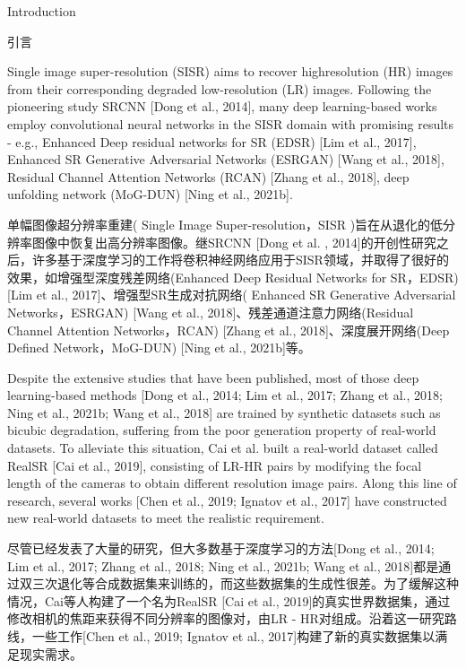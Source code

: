 Introduction

引言

Single image super-resolution (SISR) aims to recover highresolution (HR) images from their corresponding degraded low-resolution (LR) images. Following the pioneering study SRCNN [Dong et al., 2014], many deep learning-based works employ convolutional neural networks in the SISR domain with promising results - e.g., Enhanced Deep residual networks for SR (EDSR) [Lim et al., 2017], Enhanced SR Generative Adversarial Networks (ESRGAN) [Wang et al., 2018], Residual Channel Attention Networks (RCAN) [Zhang et al., 2018], deep unfolding network (MoG-DUN) [Ning et al., 2021b].

单幅图像超分辨率重建( Single Image Super-resolution，SISR )旨在从退化的低分辨率图像中恢复出高分辨率图像。继SRCNN [Dong et al. , 2014]的开创性研究之后，许多基于深度学习的工作将卷积神经网络应用于SISR领域，并取得了很好的效果，如增强型深度残差网络(Enhanced Deep Residual Networks for SR，EDSR) [Lim et al., 2017]、增强型SR生成对抗网络( Enhanced SR Generative Adversarial Networks，ESRGAN) [Wang et al., 2018]、残差通道注意力网络(Residual Channel Attention Networks，RCAN) [Zhang et al., 2018]、深度展开网络(Deep Defined Network，MoG-DUN) [Ning et al., 2021b]等。

Despite the extensive studies that have been published, most of those deep learning-based methods [Dong et al., 2014; Lim et al., 2017; Zhang et al., 2018; Ning et al., 2021b; Wang et al., 2018] are trained by synthetic datasets such as bicubic degradation, suffering from the poor generation property of real-world datasets. To alleviate this situation, Cai et al. built a real-world dataset called RealSR [Cai et al., 2019], consisting of LR-HR pairs by modifying the focal length of the cameras to obtain different resolution image pairs. Along this line of research, several works [Chen et al., 2019; Ignatov et al., 2017] have constructed new real-world datasets to meet the realistic requirement.

尽管已经发表了大量的研究，但大多数基于深度学习的方法[Dong et al., 2014; Lim et al., 2017; Zhang et al., 2018; Ning et al., 2021b; Wang et al., 2018]都是通过双三次退化等合成数据集来训练的，而这些数据集的生成性很差。为了缓解这种情况，Cai等人构建了一个名为RealSR [Cai et al., 2019]的真实世界数据集，通过修改相机的焦距来获得不同分辨率的图像对，由LR - HR对组成。沿着这一研究路线，一些工作[Chen et al., 2019; Ignatov et al., 2017]构建了新的真实数据集以满足现实需求。


